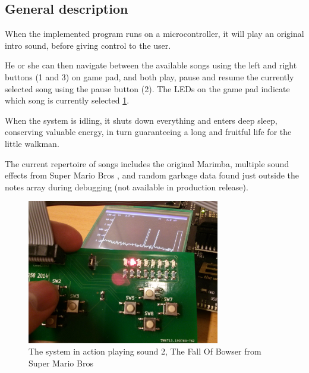 \subsection{General description}

When the implemented program runs on a microcontroller, it will play an original intro sound, before giving control to the user.

He or she can then navigate between the available songs using the left and right buttons (1 and 3) on game pad, and both play, pause and resume the currently selected song using the pause button (2).
The LEDs on the game pad indicate which song is currently selected \ref{fig:systemaction}.

When the system is idling, it shuts down everything and enters deep sleep, conserving valuable energy, in turn guaranteeing a long and fruitful life for the little walkman.

The current repertoire of songs includes the original Marimba, multiple sound effects from Super Mario Bros \cite{mariobros}, and random garbage data found just outside the notes array during debugging (not available in production release).

\begin{figure}[H]
    \centering
    \includegraphics[width=0.75\textwidth]{figures/system-in-action.jpg}
    \caption{The system in action playing sound 2, The Fall Of Bowser from Super Mario Bros}
    \label{fig:systemaction}
\end{figure}
